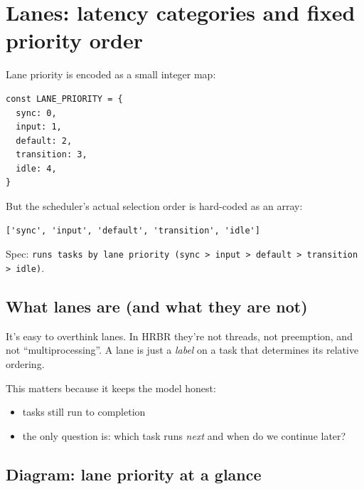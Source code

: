 \section{Lanes: latency categories and fixed priority order}

Lane priority is encoded as a small integer map:

\begin{verbatim}
const LANE_PRIORITY = {
  sync: 0,
  input: 1,
  default: 2,
  transition: 3,
  idle: 4,
}
\end{verbatim}

But the scheduler's actual selection order is hard-coded as an array:

\begin{verbatim}
['sync', 'input', 'default', 'transition', 'idle']
\end{verbatim}

Spec: \texttt{runs tasks by lane priority (sync > input > default > transition > idle)}.

\subsection{What lanes are (and what they are not)}

It's easy to overthink lanes.
In HRBR they're not threads, not preemption, and not ``multiprocessing''.
A lane is just a \emph{label} on a task that determines its relative ordering.

This matters because it keeps the model honest:

\begin{itemize}
  \item tasks still run to completion
  \item the only question is: which task runs \emph{next} and when do we continue later?
\end{itemize}

\subsection*{Diagram: lane priority at a glance}

\begin{center}
\end{center}


